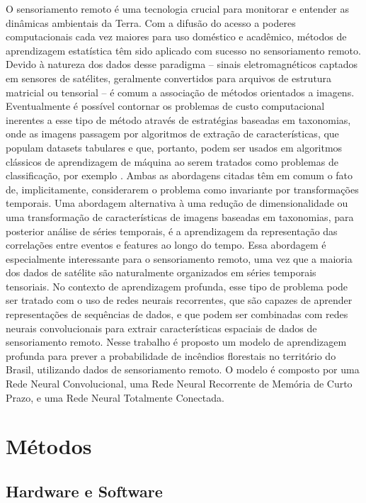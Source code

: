 \documentclass[journal]{IEEEtran}
\begin{document}
O sensoriamento remoto é uma tecnologia crucial para monitorar e entender as dinâmicas ambientais da Terra. Com a difusão do acesso a poderes computacionais cada vez maiores para uso doméstico e acadêmico, métodos de aprendizagem estatística têm sido aplicado com sucesso no sensoriamento remoto. Devido à natureza dos dados desse paradigma -- sinais eletromagnéticos captados em sensores de satélites, geralmente convertidos para arquivos de estrutura matricial ou tensorial -- é comum a associação de métodos orientados a imagens. Eventualmente é possível contornar os problemas de custo computacional inerentes a esse tipo de método através de estratégias baseadas em taxonomias, onde as imagens passagem por algoritmos de extração de características, que populam datasets tabulares e que, portanto, podem ser usados em algoritmos clássicos de aprendizagem de máquina ao serem tratados como problemas de classificação, por exemplo \cite{Dias2022,Dias2019}.\newline
Ambas as abordagens citadas têm em comum o fato de, implicitamente, considerarem o problema como invariante por transformações temporais. Uma abordagem alternativa à uma redução de dimensionalidade ou uma transformação de características de imagens baseadas em taxonomias, para posterior análise de séries temporais, é a aprendizagem da representação das correlações entre eventos e features ao longo do tempo. Essa abordagem é especialmente interessante para o sensoriamento remoto, uma vez que a maioria dos dados de satélite são naturalmente organizados em séries temporais tensoriais. No contexto de aprendizagem profunda, esse tipo de problema pode ser tratado com o uso de redes neurais recorrentes, que são capazes de aprender representações de sequências de dados, e que podem ser combinadas com redes neurais convolucionais para extrair características espaciais de dados de sensoriamento remoto.\newline
Nesse trabalho é proposto um modelo de aprendizagem profunda para prever a probabilidade de incêndios florestais no território do Brasil, utilizando dados de sensoriamento remoto. O modelo é composto por uma Rede Neural Convolucional, uma Rede Neural Recorrente de Memória de Curto Prazo, e uma Rede Neural Totalmente Conectada.\newline

\section{Métodos}

\subsection{Hardware e Software}
\end{document}
